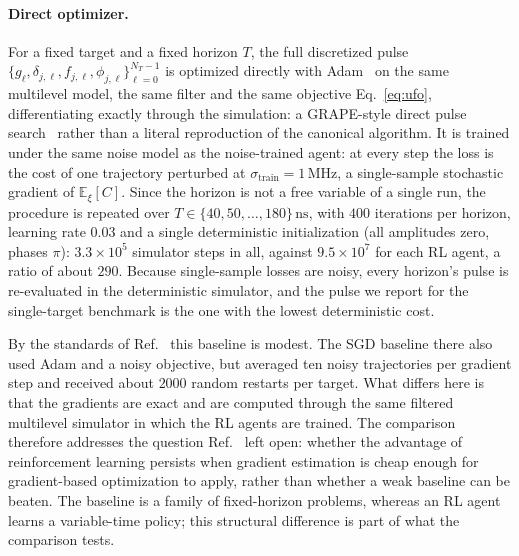 \documentclass[aps,prx,twocolumn,superscriptaddress,nofootinbib,amsmath,amssymb,floatfix]{revtex4-2}
\newcommand{\strain}{\sigma_{\mathrm{train}}}
\newcommand{\ns}{\,\mathrm{ns}}
\newcommand{\MHz}{\,\mathrm{MHz}}
\begin{document}
\paragraph*{Direct optimizer.}
For a fixed target and a fixed horizon $T$, the full discretized pulse
$\{g_\ell,\delta_{j,\ell},f_{j,\ell},\phi_{j,\ell}\}_{\ell=0}^{N_T-1}$ is optimized directly with
Adam~\cite{Kingma2015} on the same multilevel model, the same filter and the same objective
Eq.~\eqref{eq:ufo}, differentiating exactly through the simulation: a GRAPE-style direct pulse
search~\cite{Khaneja2005,Koch2022} rather than a literal reproduction of the canonical algorithm. It is
trained under the same noise model as the noise-trained agent: at every step the loss is the cost of one
trajectory perturbed at $\strain=1\MHz$, a single-sample stochastic gradient of $\mathbb{E}_\xi[C]$. Since
the horizon is not a free variable of a single run, the procedure is repeated over
$T\in\{40,50,\dots,180\}\ns$, with $400$ iterations per horizon, learning rate $0.03$ and a single
deterministic initialization (all amplitudes zero, phases $\pi$): $3.3\times10^5$ simulator steps in all,
against $9.5\times10^7$ for each RL agent, a ratio of about $290$. Because single-sample losses are noisy,
every horizon's pulse is re-evaluated in the deterministic simulator, and the pulse we report for the
single-target benchmark is the one with the lowest deterministic cost.

By the standards of Ref.~\cite{Niu2019} this baseline is modest. The SGD baseline there also used Adam
and a noisy objective, but averaged ten noisy trajectories per gradient step and received about $2000$
random restarts per target. What differs here is that the gradients are exact and are computed through
the same filtered multilevel simulator in which the RL agents are trained. The comparison therefore addresses
the question Ref.~\cite{Niu2019} left open: whether the advantage of reinforcement learning persists
when gradient estimation is cheap enough for gradient-based optimization to apply, rather than
whether a weak baseline can be beaten. The baseline is a family of fixed-horizon problems, whereas an RL agent
learns a variable-time policy; this structural difference is part of what the comparison tests.
\end{document}
